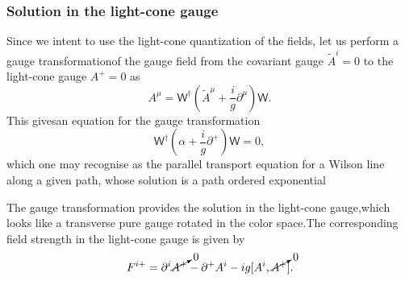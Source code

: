 \subsubsection*{Solution in the light-cone gauge} 
Since we intent to use the light-cone quantization of the fields, let us perform a gauge transformationof the gauge field from the covariant gauge $\widetilde{A}^i=0$ to the light-cone gauge $A^+=0$ as
\begin{equation*}
    A^\mu=\textsf{W}^\dag\left(\widetilde{A}^\mu+\frac{i}{g}\partial^\mu\right)\textsf{W}.
\end{equation*}
This givesan equation for the gauge transformation
\begin{equation*}
    \textsf{W}^\dag\left(\alpha+\frac{i}{g}\partial^+\right)\textsf{W}=0,
\end{equation*}
which one may recognise as the {\color{ming}\sffamily parallel transport equation for a Wilson line} along a given path, whose solution is a path ordered exponential 

The gauge transformation provides the solution in the light-cone gauge,which looks like a transverse pure gauge rotated in the color space.The corresponding field strength in the light-cone gauge is given by
\begin{align*}
F^{i+}=\partial^i\cancelto{0}{A^+}-\partial^+A^i-ig[A^i, \cancelto{0}{A^+}].
\end{align*}

